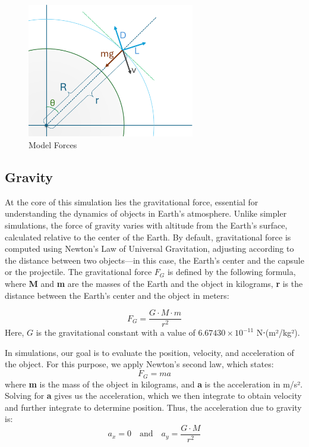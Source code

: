 \documentclass[runningheads]{llncs}
\begin{document}
\begin{figure}
\centering
\includegraphics[width=0.65\textwidth]{images/model_forces.png}
\caption{Model Forces} \label{model_forces}
\end{figure}



\subsection{Gravity}
At the core of this simulation lies the gravitational force, essential for understanding the dynamics of objects in Earth's atmosphere. Unlike simpler simulations, the force of gravity varies with altitude from the Earth's surface, calculated relative to the center of the Earth. By default, gravitational force is computed using Newton's Law of Universal Gravitation, adjusting according to the distance between two objects—in this case, the Earth's center and the capsule or the projectile. The gravitational force \textbf{\( F_G \)} is defined by the following formula, where \textbf{M} and \textbf{m} are the masses of the Earth and the object in kilograms, \textbf{r} is the distance between the Earth's center and the object in meter\cite{orlando_trajectory}s:

\begin{equation}
F_G = \frac{G \cdot M \cdot m}{r^2}
\end{equation}
Here, \( G \) is the gravitational constant with a value of \( 6.67430 \times 10^{-11} \) N⋅(m²/kg²).

In simulations, our goal is to evaluate the position, velocity, and acceleration of the object. For this purpose, we apply Newton's second law, which states:
\begin{equation}
F_G = ma
\end{equation}
where \textbf{m} is the mass of the object in kilograms, and \textbf{a} is the acceleration in m/s². Solving for \textbf{a} gives us the acceleration, which we then integrate to obtain velocity and further integrate to determine position.
Thus, the acceleration due to gravity  is:
\begin{equation}
a_x = 0 \quad \text{and} \quad a_y = \frac{G \cdot M}{r^2}
\end{equation}
\end{document}
